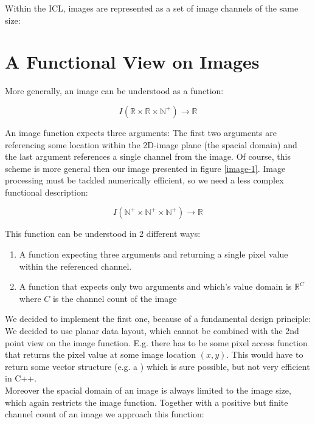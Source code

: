  Within the ICL, images are represented as a set of image channels of the same size:



\section{A Functional View on Images}
More generally, an image can be understood as a function:

\begin{equation}
I(\mathbb{R} \times{} \mathbb{R} \times{} \mathbb{N^+} )\rightarrow\mathbb{R} 
\end{equation}

An image function expects three arguments: The first two arguments are referencing some location within the 2D-image plane (the spacial domain) and the last argument references a single channel from the image. Of course, this scheme is more general then our image presented in figure \ref{image-1}. Image processing must be tackled numerically efficient, so we need a less complex functional description:

\begin{equation}
  I(\mathbb{N^+} \times{} \mathbb{N^+} \times{} \mathbb{N^+} )\rightarrow\mathbb{R} 
\end{equation}


This function can be understood in 2 different ways:
\begin{enumerate}
 \item A function expecting three arguments and returning a single pixel value within the referenced channel.
 \item A function that expects only two arguments and which's value domain is $\mathbb{R}^C$ where $C$ is the channel count of the image
\end{enumerate} 

We decided to implement the first one, because of a fundamental design principle: We decided to use planar data layout, which cannot be combined with the 2nd point view on the image function. E.g. there has to be some pixel access function that returns the pixel value at some image location $(x,y)$. This would have to return some vector structure (e.g. a ) which is sure possible, but not very efficient in C++.\\
Moreover the spacial domain of an image is always limited to the image size, which again restricts the image function. Together with a positive but finite channel count of an image we approach this function:

